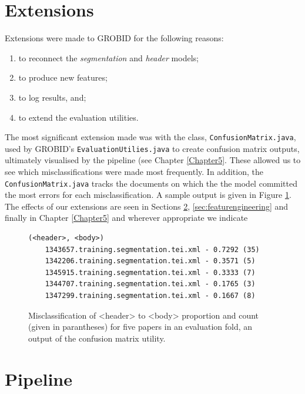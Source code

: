 \section{Extensions}

Extensions were made to GROBID for the following reasons:

\begin{enumerate}
\item to reconnect the \emph{segmentation} and \emph{header} models;
\item to produce new features;
\item to log results, and;
\item to extend the evaluation utilities.
\end{enumerate}

The most significant extension made was with the class, \texttt{ConfusionMatrix.java}, used by GROBID's \texttt{EvaluationUtilies.java} to create confusion matrix outputs, ultimately visualised by the pipeline (see Chapter \ref{Chapter5}. These allowed us to see which misclassifications were made most frequently. In addition, the \texttt{ConfusionMatrix.java} tracks the documents on which the the model committed the most errors for each misclassification. A sample output is given in Figure \ref{fig:topk}. The effects of our extensions are seen in Sections \ref{sec:pipeline}, \ref{sec:featurengineering} and finally in Chapter \ref{Chapter5} and wherever appropriate we indicate 

\begin{figure}
\centering
\begin{BVerbatim}
(<header>, <body>)
	1343657.training.segmentation.tei.xml - 0.7292 (35)
	1342206.training.segmentation.tei.xml - 0.3571 (5)
	1345915.training.segmentation.tei.xml - 0.3333 (7)
	1344707.training.segmentation.tei.xml - 0.1765 (3)
	1347299.training.segmentation.tei.xml - 0.1667 (8)
\end{BVerbatim}
\caption{Misclassification of <header> to <body> proportion and count (given in parantheses) for five papers in an evaluation fold, an output of the confusion matrix utility.}
\label{fig:topk}
\end{figure}

\section{Pipeline}
\label{sec:pipeline}

